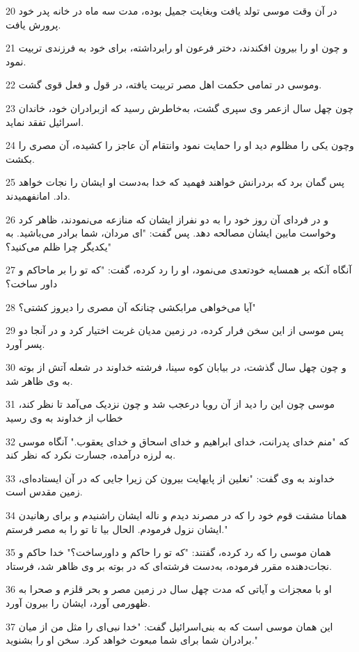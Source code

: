 \par 20 در آن وقت موسی تولد یافت وبغایت جمیل بوده، مدت سه ماه در خانه پدر خود پرورش یافت.
\par 21 و چون او را بیرون افکندند، دختر فرعون او رابرداشته، برای خود به فرزندی تربیت نمود.
\par 22 وموسی در تمامی حکمت اهل مصر تربیت یافته، در قول و فعل قوی گشت.
\par 23 چون چهل سال ازعمر وی سپری گشت، به‌خاطرش رسید که ازبرادران خود، خاندان اسرائیل تفقد نماید.
\par 24 وچون یکی را مظلوم دید او را حمایت نمود وانتقام آن عاجز را کشیده، آن مصری را بکشت.
\par 25 پس گمان برد که بردرانش خواهند فهمید که خدا به‌دست او ایشان را نجات خواهد داد. امانفهمیدند.
\par 26 و در فردای آن روز خود را به دو نفراز ایشان که منازعه می‌نمودند، ظاهر کرد وخواست مابین ایشان مصالحه دهد. پس گفت: "ای مردان، شما برادر می‌باشید. به یکدیگر چرا ظلم می‌کنید؟"
\par 27 آنگاه آنکه بر همسایه خودتعدی می‌نمود، او را رد کرده، گفت: "که تو را بر ماحاکم و داور ساخت؟
\par 28 آیا می‌خواهی مرابکشی چنانکه آن مصری را دیروز کشتی؟"
\par 29 پس موسی از این سخن فرار کرده، در زمین مدیان غربت اختیار کرد و در آنجا دو پسر آورد.
\par 30 و چون چهل سال گذشت، در بیابان کوه سینا، فرشته خداوند در شعله آتش از بوته به وی ظاهر شد.
\par 31 موسی چون این را دید از آن رویا درعجب شد و چون نزدیک می‌آمد تا نظر کند، خطاب از خداوند به وی رسید
\par 32 که "منم خدای پدرانت، خدای ابراهیم و خدای اسحاق و خدای یعقوب." آنگاه موسی به لرزه درآمده، جسارت نکرد که نظر کند.
\par 33 خداوند به وی گفت: "نعلین از پایهایت بیرون کن زیرا جایی که در آن ایستاده‌ای، زمین مقدس است.
\par 34 همانا مشقت قوم خود را که در مصرند دیدم و ناله ایشان راشنیدم و برای رهانیدن ایشان نزول فرمودم. الحال بیا تا تو را به مصر فرستم."
\par 35 همان موسی را که رد کرده، گفتند: "که تو را حاکم و داورساخت؟" خدا حاکم و نجات‌دهنده مقرر فرموده، به‌دست فرشته‌ای که در بوته بر وی ظاهر شد، فرستاد.
\par 36 او با معجزات و آیاتی که مدت چهل سال در زمین مصر و بحر قلزم و صحرا به ظهورمی آورد، ایشان را بیرون آورد.
\par 37 این همان موسی است که به بنی‌اسرائیل گفت: "خدا نبی‌ای را مثل من از میان برادران شما برای شما مبعوث خواهد کرد. سخن او را بشنوید."
